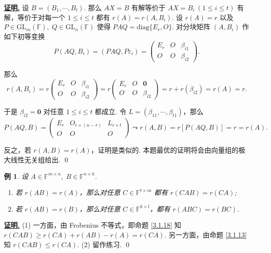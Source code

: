 \documentclass[10pt,openany]{article}
\theoremstyle{thmstyle} %
\theoremstyle{defstyle} %
\theoremstyle{prostyle} %
\theoremstyle{exastyle}
\newtheorem{example}[theorem]{例}
\theoremstyle{remstyle}
\renewenvironment{proof}[1][证明]{\par\underline{\textbf{#1.}} \;\fangsong}{\qed\par}
\newcommand{\F}{\mathbb{F}}
\newcommand{\gfn}{\text{GL}_n(\mathbb{F})}
\newcommand{\gfm}{\text{GL}_m(\mathbb{F})}
\newcommand{\mn}{^{m \times n}}
\newcommand{\diag}{\mathrm{diag}}
\begin{document}
\begin{proof}
   设 \( B=(B_1,\cdots,B_t) \). 那么 \( AX=B \) 有解等价于 \( AX=B_i \ (1 \leq i \leq t) \) 有解，等价于对每一个 \( 1 \leq i \leq t \) 都有 \( r(A)=r(A,B_i) \). 设 \( r(A)=r \) 以及 \( P \in \gfm, \; Q \in \gfn  \) 使得 \( PAQ=\diag\{E_r,O\} \). 对分块矩阵 \( (A,B_i) \) 作如下初等变换
   	\[ P(AQ,B_i)=(PAQ,P\varepsilon_i)= \begin{pmatrix}
   		E_r & O & \beta_{i1} \\
   		O & O & \beta_{i2}
   	\end{pmatrix}. \] 
   
   那么
   \[ r(A,B_i)=r\begin{pmatrix}
   	E_r & O & \beta_{i1} \\
   	O & O & \beta_{i2}
   \end{pmatrix}=r\begin{pmatrix}
   	E_r & O & \bm{0} \\
   	O & O & \beta_{i2}
   \end{pmatrix}=r+r(\beta_{i2})=r(A)=r. \]
   
   于是 \( \beta_{i2}=\bm{0} \) 对任意 \( 1 \leq i \leq t \) 都成立. 令 \( L=(\beta_{11},\cdots,\beta_{t1})\)，那么
   \[ P(AQ,B) = \begin{pmatrix}
   	E_r & O_{r \times (n-r)} & L_{r \times t} \\
   	O & O & O
   \end{pmatrix} \leadsto r(A,B)=r[P(AQ,B)]=r=r(A). \]
   
   反之，若 \( r(A,B)=r(A) \)，证明是类似的. 本题最优的证明将会由向量组的极大线性无关组给出.
\end{proof}
\begin{example} \label{3.1.29}
	设 \(  A \in \F\mn, \; B \in \F^{n \times k} \). 
	\begin{enumerate}[(1)]
		\item 若 \( r(AB)=r(A) \)，那么对任意 \( C \in \F^{t \times m} \) 都有 \( r(CAB)=r(CA) \);
		\item 若 \( r(AB)=r(B) \)，那么对任意 \( C \in \F^{k \times l} \)，都有 \( r(ABC)=r(BC) \).
	\end{enumerate}
\end{example}

\begin{proof}
	(1) 一方面，由 Frobenius 不等式，即命题 \ref{3.1.18} 知 \( r(CAB) \geq r(CA)+r(AB)-r(A)=r(CA) \). 另一方面，由命题 \ref{3.1.13} 知 \( r(CAB) \leq r(CA) \). (2) 留作练习.
\end{proof}
\end{document}

